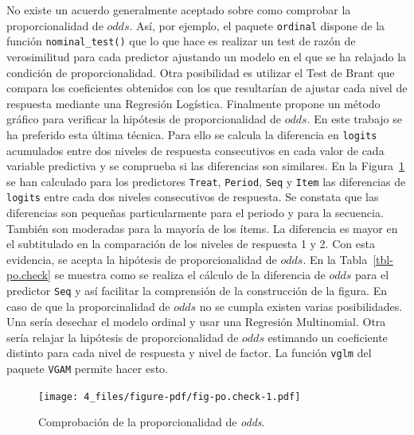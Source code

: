 \documentclass[
  12pt,
  a4paper,
  extrafontsizes,
  onecolumn,
  openright,
  table]{memoir}
\begin{document}
No existe un acuerdo generalmente aceptado sobre como comprobar la
proporcionalidad de \(odds\). Así, por ejemplo, el paquete
\texttt{ordinal} \autocite[ver][]{ordinalR} dispone de la función
\texttt{nominal\_test()} que lo que hace es realizar un test de razón de
verosimilitud para cada predictor ajustando un modelo en el que se ha
relajado la condición de proporcionalidad. Otra posibilidad es utilizar
el Test de Brant \autocite[ver][]{brant1990} que compara los
coeficientes obtenidos con los que resultarían de ajustar cada nivel de
respuesta mediante una Regresión Logística. Finalmente \textcite[ver
pp.~315-316]{harrell2015} propone un método gráfico para verificar la
hipótesis de proporcionalidad de \(odds\). En este trabajo se ha
preferido esta última técnica. Para ello se calcula la diferencia en
\texttt{logits} acumulados entre dos niveles de respuesta consecutivos
en cada valor de cada variable predictiva y se comprueba si las
diferencias son similares. En la Figura~\ref{fig-po.check} se han
calculado para los predictores \texttt{Treat}, \texttt{Period},
\texttt{Seq} y \texttt{Item} las diferencias de \texttt{logits} entre
cada dos niveles consecutivos de respuesta. Se constata que las
diferencias son pequeñas particularmente para el periodo y para la
secuencia. También son moderadas para la mayoría de los ítems. La
diferencia es mayor en el subtitulado en la comparación de los niveles
de respuesta 1 y 2. Con esta evidencia, se acepta la hipótesis de
proporcionalidad de \(odds\). En la Tabla~\ref{tbl-po.check} se muestra
como se realiza el cálculo de la diferencia de \(odds\) para el
predictor \texttt{Seq} y así facilitar la comprensión de la construcción
de la figura. En caso de que la proporcinalidad de \(odds\) no se cumpla
existen varias posibilidades. Una sería desechar el modelo ordinal y
usar una Regresión Multinomial. Otra sería relajar la hipótesis de
proporcionalidad de \(odds\) estimando un coeficiente distinto para cada
nivel de respuesta y nivel de factor. La función \texttt{vglm} del
paquete \texttt{VGAM} \autocite[ver][]{VGAMR} permite hacer esto.

\clearpage

\begin{figure}[h]

{\centering \texttt{[image: 4\_files/figure-pdf/fig-po.check-1.pdf]}

}

\caption{\label{fig-po.check}Comprobación de la proporcionalidad de
\emph{odds}.}

\end{figure}
\end{document}
